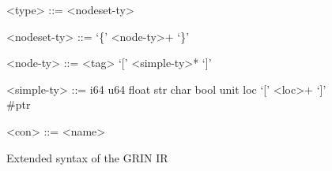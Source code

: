 \documentclass[main.tex]{subfiles}
\begin{document}
\begin{figure}
\begin{minipage}{0.45\textwidth}
\begin{grammar}
				<type> ::= <nodeset-ty>
				\alt <simple-ty>
				
				<nodeset-ty> ::= `\{' <node-ty>+ `\}'
				
				<node-ty> ::= <tag> {`['} <simple-ty>* {`]'}
		
				<simple-ty> ::= i64
				\alt u64
				\alt float
				\alt str
				\alt char
				\alt bool
				\alt unit
				\alt loc `[' <loc>+ `]'
				\alt \#ptr
				
				<con> ::= <name>
			\end{grammar}
		\end{minipage}
		
	\caption{Extended syntax of the GRIN IR}
	\end{figure}
	
\end{document}
